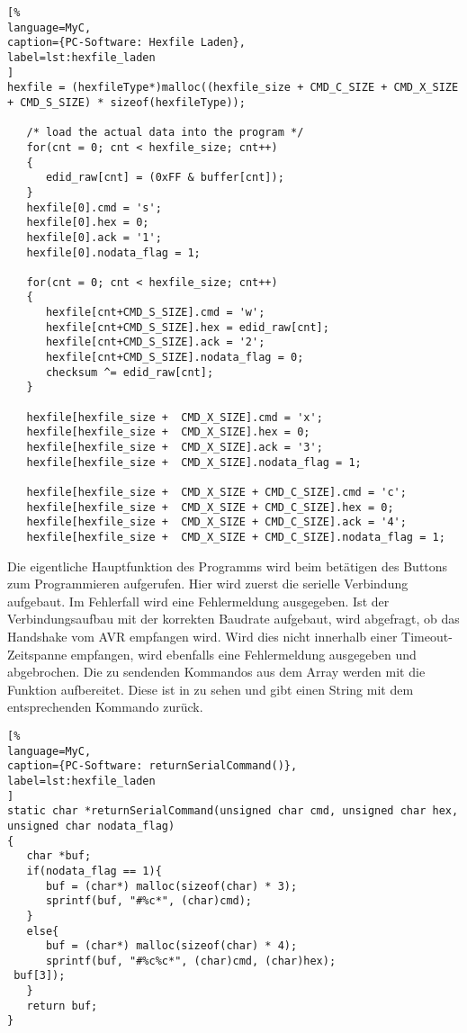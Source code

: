 \begin{lstlisting}[%
language=MyC,
caption={PC-Software: Hexfile Laden},
label=lst:hexfile_laden
]
hexfile = (hexfileType*)malloc((hexfile_size + CMD_C_SIZE + CMD_X_SIZE + CMD_S_SIZE) * sizeof(hexfileType));

   /* load the actual data into the program */
   for(cnt = 0; cnt < hexfile_size; cnt++)
   {
      edid_raw[cnt] = (0xFF & buffer[cnt]);
   }
   hexfile[0].cmd = 's';
   hexfile[0].hex = 0;
   hexfile[0].ack = '1';
   hexfile[0].nodata_flag = 1;

   for(cnt = 0; cnt < hexfile_size; cnt++)
   {
      hexfile[cnt+CMD_S_SIZE].cmd = 'w';
      hexfile[cnt+CMD_S_SIZE].hex = edid_raw[cnt];
      hexfile[cnt+CMD_S_SIZE].ack = '2';
      hexfile[cnt+CMD_S_SIZE].nodata_flag = 0;
      checksum ^= edid_raw[cnt];
   }

   hexfile[hexfile_size +  CMD_X_SIZE].cmd = 'x';
   hexfile[hexfile_size +  CMD_X_SIZE].hex = 0;
   hexfile[hexfile_size +  CMD_X_SIZE].ack = '3';
   hexfile[hexfile_size +  CMD_X_SIZE].nodata_flag = 1;

   hexfile[hexfile_size +  CMD_X_SIZE + CMD_C_SIZE].cmd = 'c';
   hexfile[hexfile_size +  CMD_X_SIZE + CMD_C_SIZE].hex = 0;
   hexfile[hexfile_size +  CMD_X_SIZE + CMD_C_SIZE].ack = '4';
   hexfile[hexfile_size +  CMD_X_SIZE + CMD_C_SIZE].nodata_flag = 1;
\end{lstlisting}%
Die eigentliche Hauptfunktion des Programms wird beim betätigen des Buttons zum Programmieren aufgerufen. Hier wird zuerst die serielle Verbindung aufgebaut. Im Fehlerfall wird eine Fehlermeldung ausgegeben. Ist der Verbindungsaufbau mit der korrekten Baudrate aufgebaut, wird abgefragt, ob das Handshake vom AVR empfangen wird. Wird dies nicht innerhalb einer Timeout-Zeitspanne empfangen, wird ebenfalls eine Fehlermeldung ausgegeben und abgebrochen. Die zu sendenden Kommandos aus dem Array  werden mit die Funktion  aufbereitet. Diese ist in  zu sehen und gibt einen String mit dem entsprechenden Kommando zurück. 
\begin{lstlisting}[%
language=MyC,
caption={PC-Software: returnSerialCommand()},
label=lst:hexfile_laden
]
static char *returnSerialCommand(unsigned char cmd, unsigned char hex, unsigned char nodata_flag)
{
   char *buf;
   if(nodata_flag == 1){
      buf = (char*) malloc(sizeof(char) * 3);
      sprintf(buf, "#%c*", (char)cmd);
   }
   else{
      buf = (char*) malloc(sizeof(char) * 4);
      sprintf(buf, "#%c%c*", (char)cmd, (char)hex);
 buf[3]);
   }
   return buf;
}
\end{lstlisting}%
